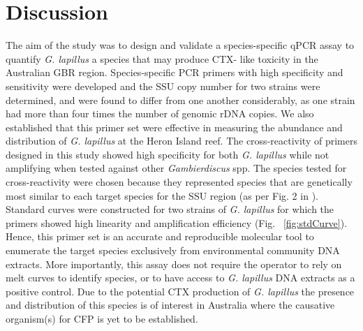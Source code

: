 \documentclass[10pt,letterpaper]{article}
\begin{document}
\section*{Discussion}
The aim of the study was to design and validate a species-specific qPCR assay to quantify \emph{G. lapillus} %
a species that may produce CTX- like toxicity in the Australian GBR region. 
Species-specific PCR primers with high specificity and sensitivity were developed and the SSU copy number for two strains were determined, and were found to differ from one another considerably, as one strain had more than four times the number of genomic rDNA copies. 
We also established that this primer set were effective in measuring the abundance and distribution of \textit{G. lapillus} at the Heron Island reef.
The cross-reactivity of primers designed in this study showed high specificity for both \emph{G. lapillus} while not amplifying when tested against other \emph{Gambierdiscus} spp. 
The species tested for cross-reactivity were chosen because they represented species that are genetically most similar to each target species for the SSU region (as per Fig. 2 in \citep{kretzschmar2017characterization}).
Standard curves were constructed for two strains of \emph{G. lapillus} for which the primers showed high linearity and amplification efficiency (Fig. ~\ref{fig:stdCurve}). 
Hence, this primer set is an accurate and reproducible molecular tool to enumerate the target species exclusively from environmental community DNA extracts. 
More importantly, this assay does not require the operator to rely on melt curves to identify species, or to have access to \emph{G. lapillus} DNA extracts as a positive control. 
Due to the potential CTX production of \emph{G. lapillus} \citep{kretzschmar2017characterization,larsson2018toxicology} the presence and distribution of this species is of interest in Australia where the causative organism(s) for CFP is yet to be established.\\
\end{document}
